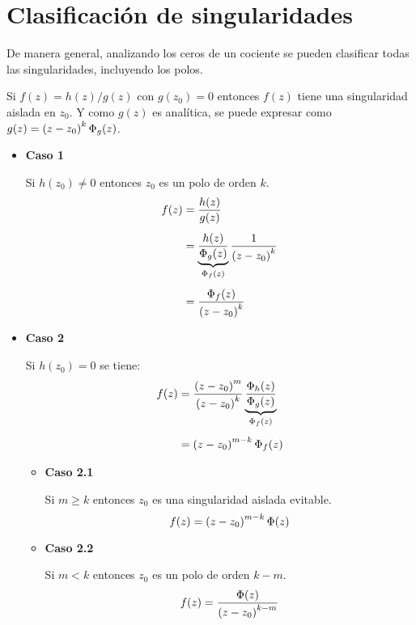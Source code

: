 \documentclass[a5paper,12pt,twoside]{book}
\begin{document}
\section{Clasificación de singularidades}

De manera general, analizando los ceros de un cociente se pueden clasificar todas las singularidades, incluyendo los polos.

Si $f(z) = h(z)/g(z)$ con $g(z_0)=0$ entonces $f(z)$ tiene una singularidad aislada en $z_0$.
Y como $g(z)$ es analítica, se puede expresar como $g(z)=\left(z-z_0\right)^k \Phi_g (z)$.

\begin{itemize}
    \item \textbf{Caso 1}
    
    Si $h(z_0) \neq 0$ entonces $z_0$ es un polo de orden $k$.
    \begin{align*}
        f(z) &= \frac{h(z)}{g(z)}
        \\[1ex]
        &= \underbrace{\frac{h(z)}{\Phi_g (z)}}_{\Phi_f (z)} \frac{1}{\left(z-z_0\right)^k}
        \\[1ex]
        &= \frac{\Phi_f (z)}{\left(z-z_0\right)^k}
    \end{align*}

    \item \textbf{Caso 2}
    
    Si $h(z_0) = 0$ se tiene:
    \begin{align*}
        f(z) &= \frac{\left(z-z_0\right)^m}{\left(z-z_0\right)^k} \underbrace{\frac{\Phi_h (z)}{\Phi_g (z)}}_{\Phi_f (z)}
        \\[1ex]
        &= \left(z-z_0\right)^{m-k} \Phi_f (z)
    \end{align*}
    
    \begin{itemize}
        \item \textbf{Caso 2.1}
        
        Si $m \geq k$ entonces $z_0$ es una singularidad aislada evitable.
        \begin{equation*}
            f(z) = \left(z-z_0\right)^{m-k} \Phi(z)
        \end{equation*}

        \item \textbf{Caso 2.2}
        
        Si $m<k$ entonces $z_0$ es un polo de orden $k-m$.
        \begin{equation*}
            f(z) = \frac{\Phi (z)}{\left(z-z_0\right)^{k-m}}
        \end{equation*}
    \end{itemize}
\end{itemize}
\end{document}
